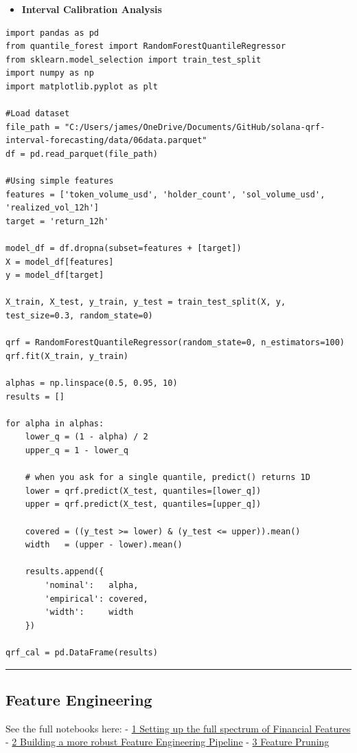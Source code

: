 \documentclass[
  a4paper,
  DIV=11,
  numbers=noendperiod]{scrreprt}
\providecommand{\tightlist}{%
  \setlength{\itemsep}{0pt}\setlength{\parskip}{0pt}}
\begin{document}
\begin{itemize}
\tightlist
\item
  \textbf{Interval Calibration Analysis}
\end{itemize}

\begin{verbatim}
import pandas as pd
from quantile_forest import RandomForestQuantileRegressor
from sklearn.model_selection import train_test_split
import numpy as np
import matplotlib.pyplot as plt

#Load dataset
file_path = "C:/Users/james/OneDrive/Documents/GitHub/solana-qrf-interval-forecasting/data/06data.parquet"
df = pd.read_parquet(file_path)

#Using simple features
features = ['token_volume_usd', 'holder_count', 'sol_volume_usd', 'realized_vol_12h']
target = 'return_12h'

model_df = df.dropna(subset=features + [target])
X = model_df[features]
y = model_df[target]

X_train, X_test, y_train, y_test = train_test_split(X, y, test_size=0.3, random_state=0)

qrf = RandomForestQuantileRegressor(random_state=0, n_estimators=100)
qrf.fit(X_train, y_train)

alphas = np.linspace(0.5, 0.95, 10)
results = []

for alpha in alphas:
    lower_q = (1 - alpha) / 2
    upper_q = 1 - lower_q

    # when you ask for a single quantile, predict() returns 1D
    lower = qrf.predict(X_test, quantiles=[lower_q])
    upper = qrf.predict(X_test, quantiles=[upper_q])

    covered = ((y_test >= lower) & (y_test <= upper)).mean()
    width   = (upper - lower).mean()

    results.append({
        'nominal':   alpha,
        'empirical': covered,
        'width':     width
    })

qrf_cal = pd.DataFrame(results)
\end{verbatim}

\begin{center}\rule{0.5\linewidth}{0.5pt}\end{center}

\subsection{Feature Engineering}\label{feature-engineering}

See the full notebooks here: -
\href{https://github.com/KetchupJL/solana-qrf-interval-forecasting/blob/main/notebooks/Feature\%20Engineering/01_features.ipynb}{1
Setting up the full spectrum of Financial Features} -
\href{https://github.com/KetchupJL/solana-qrf-interval-forecasting/blob/main/notebooks/Feature\%20Engineering/02_features_final.ipynb}{2
Building a more robust Feature Engineering Pipeline} -
\href{https://github.com/KetchupJL/solana-qrf-interval-forecasting/blob/main/notebooks/Feature\%20Engineering/03_feature_pruning.ipynb}{3
Feature Pruning}
\end{document}
